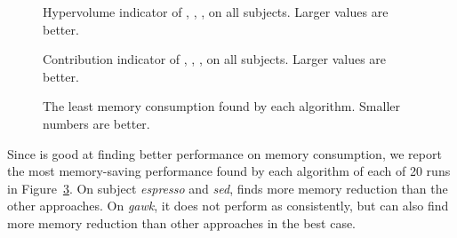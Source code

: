\begin{figure}[htbp]
	\centering
	\vspace{-1.2em}
	\caption{Hypervolume indicator of \sr{}, \sn{}, \dr{}, \dn{} on all subjects. Larger values are better.}\label{fig_hypervolume}
	\vspace{-1em}
\end{figure}

\begin{figure}[htbp]
	\centering
	\vspace{-1.2em}
	\caption{Contribution indicator of \sr{}, \sn{}, \dr{}, \dn{} on all subjects. Larger values are better.}\label{fig_contribution}
	\vspace{-1em}
\end{figure}

\begin{figure}[htb]
	\centering
	\vspace{-1.2em}
	\caption{The least memory consumption found by each algorithm. Smaller numbers are better.}\label{fig_best_memory}
	\vspace{-1em}
\end{figure}

Since \dn{} is good at finding better performance on memory consumption, we report the most memory-saving performance found by each algorithm of each of 20 runs in Figure~\ref{fig_best_memory}. On subject \emph{espresso} and \emph{sed}, \dn{} finds more memory reduction than the other approaches. On \emph{gawk}, it does not perform as consistently, but can also find more memory reduction than other approaches in the best case. 

